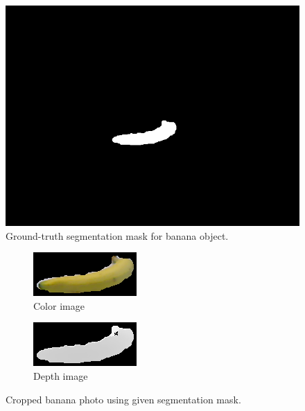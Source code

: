 \begin{figure}
    \centering
    \includegraphics[width=0.7\linewidth]{img/banana_1_1_1_mask.png}
    \caption{Ground-truth segmentation mask for banana object.}
    \label{fig:img_mask}
\end{figure}

\begin{figure}
    \centering
    \begin{subfigure}[b]{0.45\linewidth}
    	\includegraphics[width=\textwidth]{img/banana_1_1_1_crop.png}
    	\caption{Color image}
    \end{subfigure}   	
    \begin{subfigure}[b]{0.45\linewidth}
    	\includegraphics[width=\textwidth]{img/banana_1_1_1_depth_crop.png}
    	\caption{Depth image}
    \end{subfigure}
    \caption{Cropped banana photo using given segmentation mask.}
    \label{fig:img_cropped}
\end{figure}

